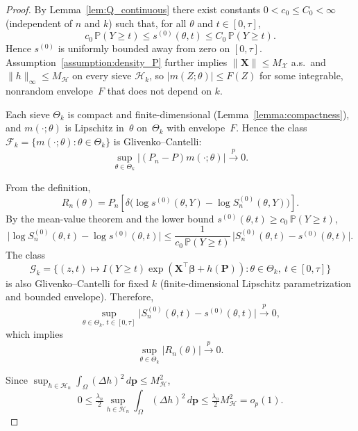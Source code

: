 \documentclass[11pt]{article}
\begin{document}
\begin{proof}
        By Lemma~\ref{lem:Q_continuous} there exist constants
        $0<c_0\le C_0<\infty$ (independent of $n$ and $k$) such that, for all $\theta$ and $t\in[0,\tau]$,
        \[
        c_0\,\mathbb P(Y\!\ge t)
        \le
        s^{(0)}(\theta,t)
        \le
        C_0\,\mathbb P(Y\!\ge t).
        \]
        Hence $s^{(0)}$ is uniformly bounded away from zero on $[0,\tau]$.  
        Assumption~\ref{assumption:density_P} further implies
        $\|\bm X\|\le M_{\mathcal X}$ a.s.\ and
        $\|h\|_\infty\le M_{\mathcal H}$ on every sieve $\mathcal H_k$,
        so $|m(Z;\theta)|\le F(Z)$ for some integrable, nonrandom envelope~$F$
        that does not depend on $k$.
        
        Each sieve $\Theta_k$ is compact and finite-dimensional
        (Lemma~\ref{lemma:compactness}),
        and $m(\cdot;\theta)$ is Lipschitz in~$\theta$ on~$\Theta_k$
        with envelope~$F$.
        Hence the class
        $\mathcal F_k=\{m(\cdot;\theta):\theta\in\Theta_k\}$ is Glivenko--Cantelli:
        \begin{equation}\label{eq:gc-fixed}
        \sup_{\theta\in\Theta_k}\big|(P_n-P)m(\cdot;\theta)\big|\xrightarrow{p}0 .
        \end{equation}
        
        From the definition,
        \[
        R_n(\theta)
        = P_n\!\left[\delta\big(\log s^{(0)}(\theta,Y)-\log S_n^{(0)}(\theta,Y)\big)\right].
        \]
        By the mean-value theorem and the lower bound $s^{(0)}(\theta,t)\ge c_0\,\mathbb P(Y\!\ge t)$,
        \[
        \big|\log S_n^{(0)}(\theta,t)-\log s^{(0)}(\theta,t)\big|
        \le \frac{1}{c_0\,\mathbb P(Y\!\ge t)}\,\big|S_n^{(0)}(\theta,t)-s^{(0)}(\theta,t)\big|.
        \]
        The class
        \[
        \mathcal G_k
        =\Big\{(z,t)\mapsto I(Y\ge t)\exp(\bm X^{\!\top}\bm\beta+h(\bm P)):
        \theta\in\Theta_k,\ t\in[0,\tau]\Big\}
        \]
        is also Glivenko--Cantelli for fixed $k$ (finite-dimensional Lipschitz parametrization and bounded envelope). Therefore,
        \[
        \sup_{\theta\in\Theta_k,\,t\in[0,\tau]}
        \big|S_n^{(0)}(\theta,t)-s^{(0)}(\theta,t)\big|\xrightarrow{p}0,
        \]
        which implies
        \begin{equation}\label{eq:Rn-fixed}
        \sup_{\theta\in\Theta_k}|R_n(\theta)|\xrightarrow{p}0.
        \end{equation}
        
        Since $\sup_{h\in\mathcal H_n}\!\int_\Omega(\Delta h)^2\,d\bm p\le M_{\mathcal H}^2$,
        \begin{equation}\label{eq:penalty-term}
        0\le
        \tfrac{\lambda_n}{2}
        \sup_{h\in\mathcal H_n}\!\int_\Omega(\Delta h)^2\,d\bm p
        \le
        \tfrac{\lambda_n}{2}M_{\mathcal H}^2
        =o_p(1).
        \end{equation}
        


\end{proof}
\end{document}

